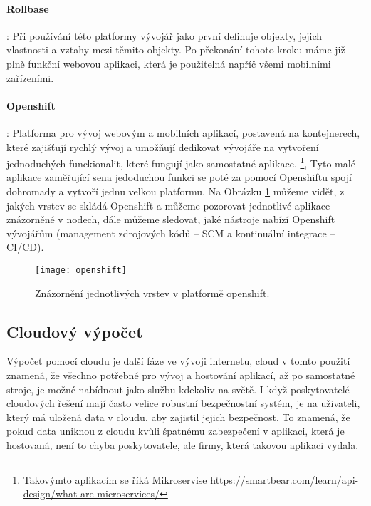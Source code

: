 \paragraph{Rollbase}: Při používání této platformy vývojář jako první definuje objekty, jejich vlastnosti a vztahy mezi těmito objekty. Po překonání tohoto kroku máme již plně funkční webovou aplikaci, která je použitelná napříč všemi mobilními zařízeními. \cite{what-is-low-code}
\paragraph{Openshift}: Platforma pro vývoj webovým a mobilních aplikací, postavená na kontejnerech, které zajišťují rychlý vývoj a umožňují dedikovat vývojáře na vytvoření jednoduchých funckionalit, které fungují jako samostatné aplikace. \footnote{Takovýmto aplikacím se říká Mikroservise \url{https://smartbear.com/learn/api-design/what-are-microservices/}}, Tyto malé aplikace zaměřující sena jedoduchou funkci se poté za pomocí Openshiftu spojí dohromady a vytvoří jednu velkou platformu. Na Obrázku \ref{openshift-vrstvy} můžeme vidět, z jakých vrstev se skládá Openshift a můžeme pozorovat jednotlivé aplikace znázorněné v nodech, dále můžeme sledovat, jaké nástroje nabízí Openshift vývojářům (management zdrojových kódů -- SCM a kontinuální integrace -- CI/CD).\cite{openshift-overview}
\begin{figure}[h]
\centering
\texttt{[image: openshift]}
\caption{Znázornění jednotlivých vrstev v platformě openshift.}
\label{openshift-vrstvy}
\end{figure}

\subsection{Cloudový výpočet}
\par Výpočet pomocí cloudu je další fáze ve vývoji internetu, cloud v tomto použití znamená, že všechno potřebné pro vývoj a hostování aplikací, až po samostatné stroje, je možné nabídnout jako službu kdekoliv na světě. I když poskytovatelé cloudových řešení mají často velice robustní bezpečnostní systém, je na uživateli, který má uložená data v cloudu, aby zajistil jejich bezpečnost. To znamená, že pokud data uniknou z cloudu kvůli špatnému zabezpečení v aplikaci, která je hostovaná, není to chyba poskytovatele, ale firmy, která takovou aplikaci vydala.\cite{cloud-computing-dummies}

